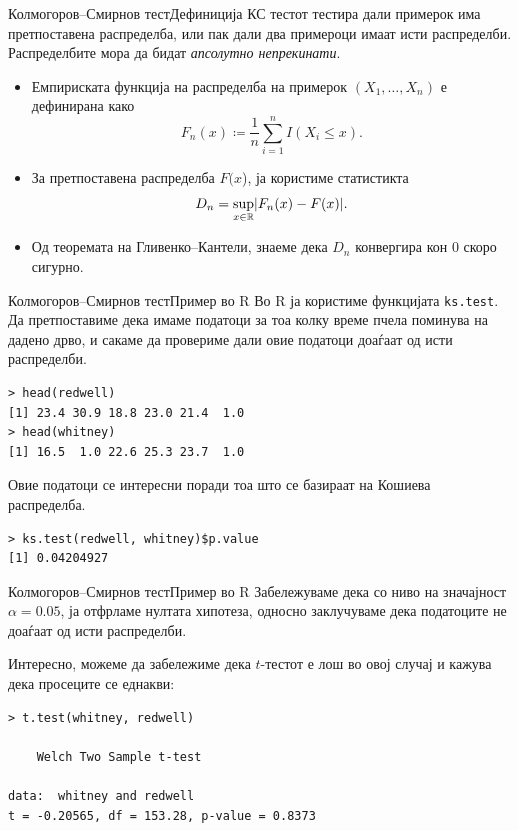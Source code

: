 \documentclass[hyperref={unicode}, xcolor={svgnames, table},
usepdftitle=false]{beamer}
\DeclarePairedDelimiter\abs{\lvert}{\rvert}
\theoremstyle{remark}
\begin{document}
\begin{frame}{Колмогоров--Смирнов тест}{Дефиниција}
  КС тестот тестира дали примерок има претпоставена распределба, или пак дали
  два примероци имаат исти распределби.  Распределбите мора да бидат
  \emph{апсолутно непрекинати}.
  \begin{itemize}
  \item Емпириската функција на распределба на примерок \((X_1, \ldots, X_n)\) е
    дефинирана како
    \[
      F_n(x) \coloneqq \frac{1}{n} \sum\limits_{i = 1}^{n} I(X_i \le x)\text{.}
    \]
  \item За претпоставена распределба \(F(x\)), ја користиме статистикта
    \[
      D_n = \sup_{x \in \mathbb{R}} \abs{F_n(x) - F(x)}\text{.}
    \]
  \item Од теоремата на Гливенко--Кантели, знаеме дека \(D_n\) конвергира кон
    \(0\) скоро сигурно.
  \end{itemize}
\end{frame}

\begin{frame}[fragile]{Колмогоров--Смирнов тест}{Пример во R}
  Во R ја користиме функцијата \texttt{ks.test}.  Да претпоставиме дека
  имаме податоци за тоа колку време пчела поминува на дадено дрво, и сакаме да
  провериме дали овие податоци доаѓаат од исти распределби.
\begin{verbatim}
> head(redwell)
[1] 23.4 30.9 18.8 23.0 21.4  1.0
> head(whitney)
[1] 16.5  1.0 22.6 25.3 23.7  1.0
\end{verbatim}
  Овие податоци се интересни поради тоа што се базираат на Кошиева распределба.
\begin{verbatim}
> ks.test(redwell, whitney)$p.value
[1] 0.04204927
\end{verbatim}
\end{frame}

\begin{frame}[fragile]{Колмогоров--Смирнов тест}{Пример во R}
  Забележуваме дека со ниво на значајност \(\alpha = \num{0.05}\), ја отфрламе
  нултата хипотеза, односно заклучуваме дека податоците не доаѓаат од исти
  распределби.

  Интересно, можеме да забележиме дека \(t\)-тестот е лош во овој случај и
  кажува дека просеците се еднакви:
\begin{verbatim}
> t.test(whitney, redwell)

	Welch Two Sample t-test

data:  whitney and redwell
t = -0.20565, df = 153.28, p-value = 0.8373
\end{verbatim}
\end{frame}
\end{document}
